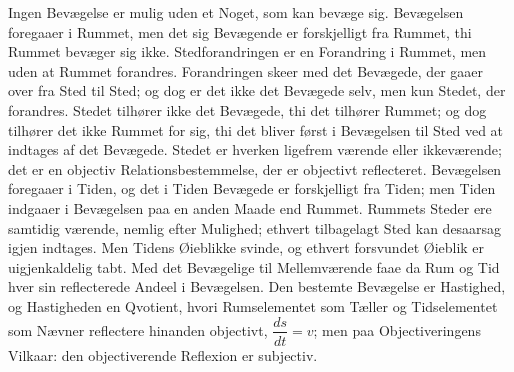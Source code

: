 \documentclass[12pt,a4paper]{book}
\begin{document}
Ingen Bevægelse er mulig uden et Noget, som kan bevæge sig. Bevægelsen
foregaaer i Rummet, men det sig Bevægende er forskjelligt fra Rummet,
thi Rummet bevæger sig ikke. Stedforandringen er en Forandring i
Rummet, men uden at Rummet forandres. Forandringen skeer med det
Bevægede, der gaaer over fra Sted til Sted; og dog er det ikke det
Bevægede selv, men kun Stedet, der forandres. Stedet tilhører ikke det
Bevægede, thi det tilhører Rummet; og dog tilhører det ikke Rummet for
sig, thi det bliver først i Bevægelsen til Sted ved at indtages af det
Bevægede. Stedet er hverken ligefrem værende eller ikkeværende; det er
en objectiv Relationsbestemmelse, der er objectivt reflecteret.
Bevægelsen foregaaer i Tiden, og det i Tiden Bevægede er forskjelligt
fra Tiden; men Tiden indgaaer i Bevægelsen paa en anden Maade end
Rummet. Rummets Steder ere samtidig værende, nemlig efter Mulighed;
ethvert tilbagelagt Sted kan desaarsag igjen indtages. Men Tidens
Øieblikke svinde, og ethvert forsvundet Øieblik er uigjenkaldelig tabt.
Med det Bevægelige til Mellemværende faae da Rum og Tid hver sin
reflecterede Andeel i Bevægelsen. Den bestemte Bevægelse er Hastighed,
og Hastigheden en Qvotient, hvori Rumselementet som Tæller og
Tidselementet som Nævner reflectere hinanden objectivt,
$\dfrac{ds}{dt} = v$; men paa Objectiveringens Vilkaar: den
objectiverende Reflexion er subjectiv.
\end{document}
